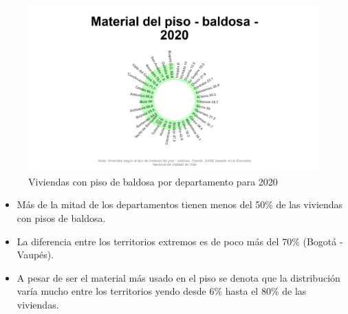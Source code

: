     \begin{figure}[H]
        \caption{Viviendas con piso de baldosa por departamento para 2020 \label{map_result_2} }
        \begin{center}
        \includegraphics[width=\textwidth,keepaspectratio]{img/var_173_static.png}
        \end{center}
    \end{figure}
            \begin{itemize}
                    \item Más de la mitad de los departamentos tienen menos del 50\% de las viviendas con pisos de baldosa.
                    \item La diferencia entre los territorios extremos es de poco más del 70\% (Bogotá - Vaupés).
                    \item A pesar de ser el material más usado en el piso se denota que la distribución varía mucho entre los territorios yendo desde 6\% hasta el 80\% de las viviendas.
                    \end{itemize}

